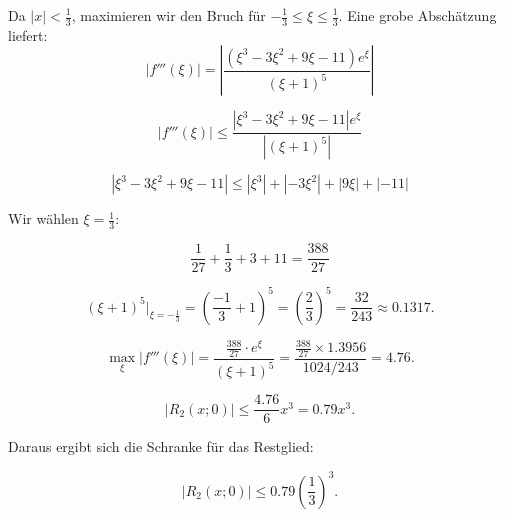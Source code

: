 {\begin{enumerate}
    Da \( |x| < \frac{1}{3} \), maximieren wir den Bruch für \( -\frac{1}{3} \leq \xi \leq \frac{1}{3} \). Eine grobe Abschätzung liefert:
    \[
    \left| f'''(\xi) \right| = \left| \frac{(\xi^3 - 3\xi^2 + 9\xi - 11)e^\xi}{(\xi+1)^5} \right|
    \]
    
    \[
    \left| f'''(\xi) \right| \leq \frac{\left| \xi^3 - 3\xi^2 + 9\xi - 11 \right| e^\xi}{|(\xi+1)^5|}
    \]
    
    \[
    \left| \xi^3 - 3\xi^2 + 9\xi - 11 \right| \leq \left| \xi^3 \right| + \left| -3\xi^2 \right| + \left| 9\xi \right| + \left| -11 \right|
    \]
    
    Wir w\"ahlen \( \xi = \frac{1}{3} \):
    
    \[
    \frac{1}{27} + \frac{1}{3} + 3 + 11 = \frac{388}{27}
    \]
    
    \[
    (\xi+1)^5 \bigg|_{\xi = -\frac{1}{3}} =  \left(\frac{-1}{3}+1\right)^5=\left(\frac{2}{3}\right)^5 = \frac{32}{243} \approx 0.1317.
    \]
    
    \[
    \max_{\xi} |f'''(\xi)| = \frac{\frac{388}{27} \cdot e^\xi}{(\xi+1)^5} = \frac{\frac{388}{27} \times 1.3956}{1024/243} = 4.76.
    \]
    
    \[
    \left| R_2(x; 0) \right| \leq \frac{4.76}{6} x^3 = 0.79 x^3.
    \]
    
    
    Daraus ergibt sich die Schranke für das Restglied:
    
    \[
    |R_2(x; 0)| \leq 0.79 \left(\frac{1}{3}\right)^3.
    \]
    
\end{enumerate}
}
